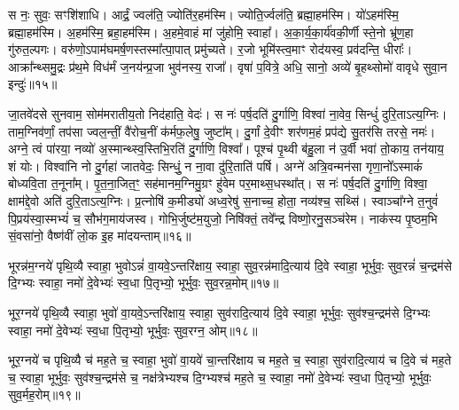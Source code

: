 स नः॒ सुवः॒ सꣳशि॑शाधि। 
आर्द्रं॒ ज्वल॑ति॒ ज्योति॑र॒हम॑स्मि। 
ज्योति॒र्ज्वल॑ति॒ ब्रह्मा॒हम॑स्मि। 
यो॑ऽहम॑स्मि॒ ब्रह्मा॒हम॑स्मि। 
अ॒हम॑स्मि॒ ब्रहा॒हम॑स्मि। 
अ॒हमे॒वाहं मां जु॑होमि॒ स्वाहा᳚। 
अ॒का॒र्य॒का॒र्य॑वकी॒र्णी स्ते॒नो भ्रू॑ण॒हा गु॑रुत॒ल्पगः। 
वरु॑णो॒ऽपाम॑घ\-मर्\mbox{}ष॒णस्तस्मा᳚त्पा॒पात् प्रमु॑च्यते। 
र॒जो भूमि॑स्त्व॒माꣳ रोद॑यस्व॒ प्रव॑दन्ति॒ धीराः᳚। 
आक्रा᳚न्थ्समु॒द्रः प्र॑थ॒मे विध॑र्मं ज॒नय॑न्प्र॒जा भुव॑नस्य॒ राजा᳚। 
वृषा॑ प॒वित्रे॒ अधि॒ सानो॒ अव्ये॑ बृ॒हथ्सोमो॑ वावृधे सुवा॒न इन्दुः॑॥१५॥
\anuvakamend

जा॒तवे॑दसे सुनवाम॒ सोम॑मरातीय॒तो निद॑हाति॒ वेदः॑। 
स नः॑ पर्\mbox{}ष॒दति॑ दु॒र्गाणि॒ विश्वा॑ ना॒वेव॒ सिन्धुं॑ दुरि॒ताऽत्य॒ग्निः। 
ताम॒ग्निव॑र्णां॒ तप॑सा ज्वल॒न्तीं॒ वै॑रोच॒नीं क॑र्मफ॒लेषु॒ जुष्टा᳚म्। 
दु॒र्गां दे॒वीꣳ शर॑णम॒हं प्रप॑द्ये सु॒तर॑सि तरसे॒ नमः॑। 
अग्ने॒ त्वं पा॑रया॒ नव्यो॑ अ॒स्मान्थ्स्व॒स्तिभि॒रति॑ दु॒र्गाणि॒ विश्वा᳚। 
पूश्च॑ पृ॒थ्वी ब॑हु॒ला न॑ उ॒र्वी भवा॑ तो॒काय॒ तन॑याय॒ शं योः। 
विश्वा॑नि नो दु॒र्गहा॑ जातवेदः॒ सिन्धुं॒ न ना॒वा दु॑रि॒ताति॑ पर्\mbox{}षि। 
अग्ने॑ अत्रि॒वन्मन॑सा गृणा॒नो᳚ऽस्माकं॑ बोध्यवि॒ता त॒नूना᳚म्। 
पृ॒त॒ना॒जित॒ꣳ॒ सह॑मानम॒ग्निमु॒ग्रꣳ हु॑वेम पर॒माथ्स॒धस्था᳚त्। 
स नः॑ पर्\mbox{}ष॒दति॑ दु॒र्गाणि॒ विश्वा॒ क्षाम॑द्दे॒वो अति॑ दुरि॒ताऽत्य॒ग्निः। 
प्र॒त्नोषि॑ क॒मीड्यो॑ अध्व॒रेषु॑ स॒नाच्च॒ होता॒ नव्य॑श्च॒ सथ्सि॑। 
स्वाञ्चा᳚ग्ने त॒नुवं॑ पि॒प्रय॑स्वा॒स्मभ्यं॑ च॒ सौभ॑ग॒माय॑जस्व। 
गोभि॒र्जुष्ट॑म॒युजो॒ निषि॑क्तं॒ तवे᳚न्द्र विष्णो॒रनु॒सञ्च॑रेम। 
नाक॑स्य पृ॒ष्ठम॒भि सं॒वसा॑नो॒ वैष्ण॑वीं लो॒क इ॒ह मा॑दयन्ताम्॥१६॥
\anuvakamend%


भूरन्न॑म॒ग्नये॑ पृथि॒व्यै स्वाहा॒ भुवोऽन्नं॑ वा॒यवे॒ऽन्तरि॑क्षाय॒ स्वाहा॒ सुव॒रन्न॑मादि॒त्याय॑ दि॒वे स्वाहा॒ भूर्भुवः॒ सुव॒रन्नं॑ च॒न्द्रम॑से दि॒ग्भ्यः स्वाहा॒ नमो॑ दे॒वेभ्यः॑ स्व॒धा पि॒तृभ्यो॒ भूर्भुवः॒ सुव॒रन्न॒मोम्॥१७॥
\anuvakamend

भूर॒ग्नये॑ पृथि॒व्यै स्वाहा॒ भुवो॑ वा॒यवे॒ऽन्तरि॑क्षाय॒ स्वाहा॒ सुव॑रादि॒त्याय॑ दि॒वे स्वाहा॒ भूर्भुवः॒ सुव॑श्च॒न्द्रम॑से दि॒ग्भ्यः स्वाहा॒ नमो॑ दे॒वेभ्यः॑ स्व॒धा पि॒तृभ्यो॒ भूर्भुवः॒ सुव॒रग्न॒ ओम्॥१८॥
\anuvakamend

भूर॒ग्नये॑ च पृथि॒व्यै च॑ मह॒ते च॒ स्वाहा॒ भुवो॑ वा॒यवे॑ चा॒न्तरि॑क्षाय च मह॒ते च॒ स्वाहा॒ सुव॑रादि॒त्याय॑ च दि॒वे च॑ मह॒ते च॒ स्वाहा॒ भूर्भुवः॒ सुव॑श्च॒न्द्रम॑से च॒ नक्ष॑त्रेभ्यश्च दि॒ग्भ्यश्च॑ मह॒ते च॒ स्वाहा॒ नमो॑ दे॒वेभ्यः॑ स्व॒धा पि॒तृभ्यो॒ भूर्भुवः॒ सुव॒र्मह॒रोम्॥१९॥ 
\anuvakamend

